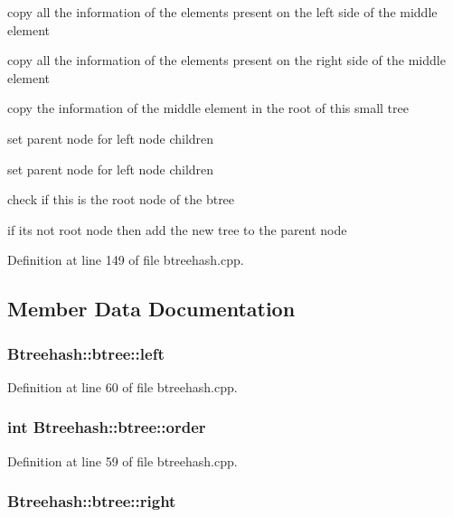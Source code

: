 copy all the information of the elements present on the left side of the middle element

copy all the information of the elements present on the right side of the middle element

copy the information of the middle element in the root of this small tree

set parent node for left node children

set parent node for left node children

check if this is the root node of the btree

if its not root node then add the new tree to the parent node 

Definition at line 149 of file btreehash.\-cpp.



\subsection{Member Data Documentation}
\hypertarget{class_btreehash_1_1btree_a28446f49e1bc8ce73a574f012ab635b8}{
\subsubsection[{left}]{ Btreehash\-::btree\-::left}}\label{class_btreehash_1_1btree_a28446f49e1bc8ce73a574f012ab635b8}


Definition at line 60 of file btreehash.\-cpp.

\hypertarget{class_btreehash_1_1btree_a7ca6fafd2339665f465b893c2d42af96}{
\subsubsection[{order}]{\setlength{\rightskip}{0pt plus 5cm}int Btreehash\-::btree\-::order}}\label{class_btreehash_1_1btree_a7ca6fafd2339665f465b893c2d42af96}


Definition at line 59 of file btreehash.\-cpp.

\hypertarget{class_btreehash_1_1btree_a9080e564fcae45de5f86131e7bbda303}{
\subsubsection[{right}]{ Btreehash\-::btree\-::right}}\label{class_btreehash_1_1btree_a9080e564fcae45de5f86131e7bbda303}


